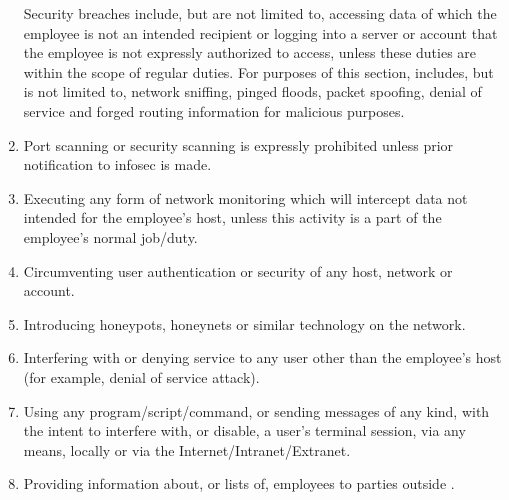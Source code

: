 \begin{enumerate}
Security breaches include, but are not limited to, accessing data of which the employee is not an intended recipient or logging into a server or account that the employee is not expressly authorized to access, unless these duties are within the scope of regular duties.  
For purposes of this section,  includes, but is not limited to, network sniffing, pinged floods, packet spoofing, denial of service\oxford{} and forged routing information for malicious purposes.
\item
Port scanning or security scanning is expressly prohibited unless prior notification to \gls{infosec} is made.
\item
Executing any form of network monitoring which will intercept data not intended for the employee's host, unless this activity is a part of the employee's normal job/duty.
\item
Circumventing user authentication or security of any host, network\oxford{} or account.
\item
Introducing honeypots, honeynets\oxford{} or similar technology on the \CompanyName{} network.
\item
Interfering with or denying service to any user other than the employee's host (for example, denial of service attack).
\item
Using any program/script/command, or sending messages of any kind, with the intent to interfere with, or disable, a user's terminal session, via any means, locally or via the Internet/Intranet/Extranet.
\item
Providing information about, or lists of, \CompanyName{} employees to parties outside \CompanyName{}.
\end{enumerate}

